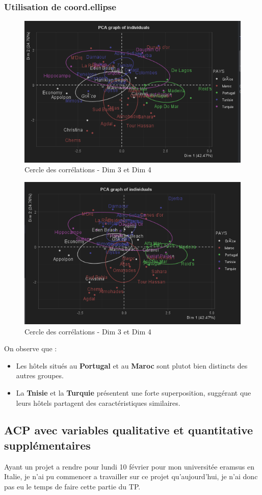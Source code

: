 \documentclass{article}
\begin{document}
    \subsubsection{Utilisation de coord.ellipse}
    \begin{figure}[H]
        \centering
        \includegraphics[width=0.6\linewidth]{img/PlotPCA1}
        \caption{Cercle des corrélations - Dim 3 et Dim 4}
    \end{figure}
    \begin{figure}[H]
        \centering
        \includegraphics[width=0.6\linewidth]{img/PlotPCA2}
        \caption{Cercle des corrélations - Dim 3 et Dim 4}
    \end{figure}
    On observe que :
    \begin{itemize}
        \item Les hôtels situés au \textbf{Portugal} et au \textbf{Maroc} sont plutot bien distincts des autres groupes.
        \item La \textbf{Tnisie} et la \textbf{Turquie} présentent une forte superposition, suggérant que leurs hôtels partagent des caractéristiques similaires.
    \end{itemize}
    \subsection{ACP avec variables qualitative et quantitative supplémentaires}
    Ayant un projet a rendre pour lundi 10 février pour mon universitée eramsus en Italie, je n'ai pu commencer a travailler sur ce projet qu'aujourd'hui, je n'ai donc pas eu le temps de faire cette partie du TP.
\end{document}
